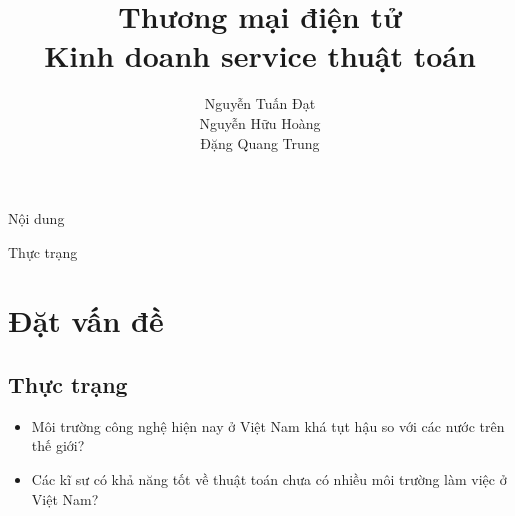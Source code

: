 \documentclass{beamer}
\title[]{{\huge \bf Thương mại điện tử}\\
 \large Kinh doanh service thuật toán }
\author[]{
Nguyễn Tuấn Đạt\\%
Nguyễn Hữu Hoàng \\
Đặng Quang Trung\\
}
\institute[]{
}
\newcommand{\bi}{\begin{itemize}}
\newcommand{\ei}{\end{itemize}}
\begin{document}
\begin{frame}
\titlepage
\end{frame}

\begin{frame}{Nội dung}
\tableofcontents
\end{frame}

\begin{frame}{Thực trạng}
\section{ Đặt vấn đề}
\subsection{Thực trạng}
\bi 
\item Môi trường công nghệ hiện nay ở Việt Nam khá tụt hậu so với các nước trên thế giới?
\item Các kĩ sư có khả năng tốt về thuật toán chưa có nhiều môi trường làm việc ở Việt Nam?
\ei 
\end{frame}
\end{document}
